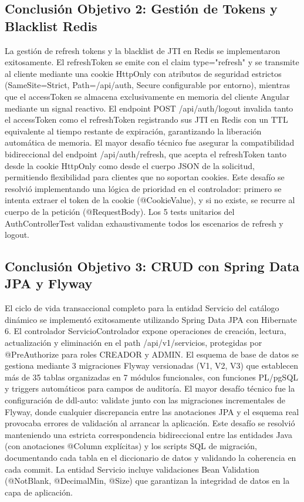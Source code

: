 \documentclass[
]{article}
\begin{document}
\subsection{Conclusión Objetivo 2: Gestión de Tokens y Blacklist
Redis}

La gestión de refresh tokens y la blacklist de JTI en Redis se
implementaron exitosamente. El refreshToken se emite con el claim
type="refresh" y se transmite al cliente mediante una cookie HttpOnly
con atributos de seguridad estrictos (SameSite=Strict, Path=/api/auth,
Secure configurable por entorno), mientras que el accessToken se
almacena exclusivamente en memoria del cliente Angular mediante un
signal reactivo. El endpoint POST /api/auth/logout invalida tanto el
accessToken como el refreshToken registrando sus JTI en Redis con un TTL
equivalente al tiempo restante de expiración, garantizando la liberación
automática de memoria. El mayor desafío técnico fue asegurar la
compatibilidad bidireccional del endpoint /api/auth/refresh, que acepta
el refreshToken tanto desde la cookie HttpOnly como desde el cuerpo JSON
de la solicitud, permitiendo flexibilidad para clientes que no soportan
cookies. Este desafío se resolvió implementando una lógica de prioridad
en el controlador: primero se intenta extraer el token de la cookie
(@CookieValue), y si no existe, se recurre al cuerpo de la petición
(@RequestBody). Los 5 tests unitarios del AuthControllerTest validan
exhaustivamente todos los escenarios de refresh y logout.

\subsection{Conclusión Objetivo 3: CRUD con Spring Data JPA y
Flyway}

El ciclo de vida transaccional completo para la entidad Servicio del
catálogo dinámico se implementó exitosamente utilizando Spring Data JPA
con Hibernate 6. El controlador ServicioControlador expone operaciones
de creación, lectura, actualización y eliminación en el path
/api/v1/servicios, protegidas por @PreAuthorize para roles CREADOR y
ADMIN. El esquema de base de datos se gestiona mediante 3 migraciones
Flyway versionadas (V1, V2, V3) que establecen más de 35 tablas
organizadas en 7 módulos funcionales, con funciones PL/pgSQL y triggers
automáticos para campos de auditoría. El mayor desafío técnico fue la
configuración de ddl-auto: validate junto con las migraciones
incrementales de Flyway, donde cualquier discrepancia entre las
anotaciones JPA y el esquema real provocaba errores de validación al
arrancar la aplicación. Este desafío se resolvió manteniendo una
estricta correspondencia bidireccional entre las entidades Java (con
anotaciones @Column explícitas) y los scripts SQL de migración,
documentando cada tabla en el diccionario de datos y validando la
coherencia en cada commit. La entidad Servicio incluye validaciones Bean
Validation (@NotBlank, @DecimalMin, @Size) que garantizan la integridad
de datos en la capa de aplicación.
\end{document}
